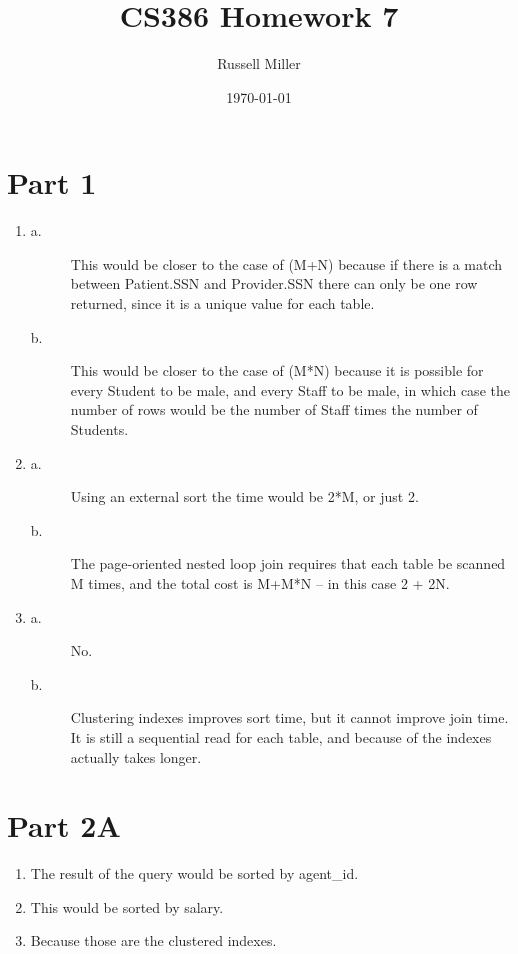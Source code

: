 \documentclass{article}
\title{CS386 Homework 7}
\author{Russell Miller}
\date{\today}
\begin{document}
\maketitle

\section*{Part 1}
\begin{enumerate}
\item
\begin{description}
\item[a.]
This would be closer to the case of (M+N) because if there is
a match between Patient.SSN and Provider.SSN there can only be
one row returned, since it is a unique value for each table.\\

\item[b.]
This would be closer to the case of (M*N) because it is possible
for every Student to be male, and every Staff to be male, in which
case the number of rows would be the number of Staff times the number
of Students.\\

\end{description}

\item
\begin{description}
\item[a.]
Using an external sort the time would be 2*M, or just 2.

\item[b.]
The page-oriented nested loop join requires that each table be scanned
M times, and the total cost is M+M*N -- in this case 2 + 2N.

\end{description}

\item
\begin{description}
\item[a.]
No.

\item[b.]
Clustering indexes improves sort time, but it cannot improve join time.
It is still a sequential read for each table, and because of the indexes
actually takes longer.

\end{description}
\end{enumerate}

\section*{Part 2A}
\begin{enumerate}
\item The result of the query would be sorted by agent\_id.
\item This would be sorted by salary.
\item Because those are the clustered indexes.
\end{enumerate}
\end{document}
